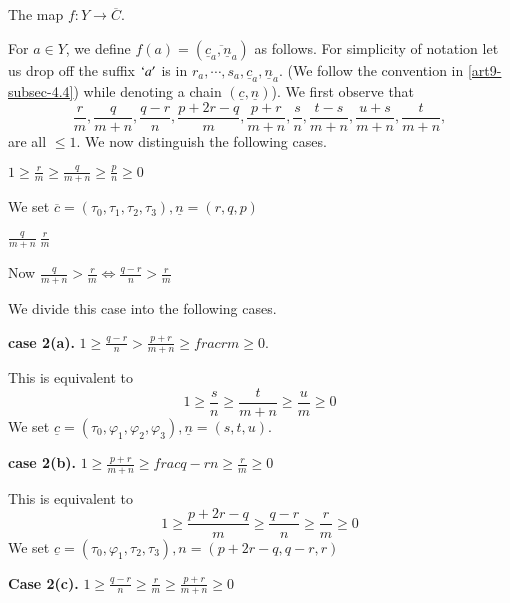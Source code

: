 \subsection{}\label{art9-subsec-8.3}

The map $f : Y \rightarrow \overline{C}$.

For $a \in Y$, we define $f(a)= (\overline{\underline{c}_{a}, \underline{n}_{a}})$ as follows. For simplicity of notation let us drop off the suffix $`a'$ is in $r_{a}, \cdots , s_{a}, \underline{c}_{a}, \underline{n}_{a}$. (We follow the
convention in \ref{art9-subsec-4.4}) while denoting a chain $(\underline{c}, \underline{n})$). We first observe that
$$
\frac{r}{m}, \frac{q}{m+n}, \frac{q-r}{n}, \frac{p+2r-q}{m}, \frac{p+r}{m+n}, \frac{s}{n}, \frac{t-s}{m+n}, \frac{u+s}{m+n}, \frac{t}{m+n},
$$ 
are all $\leq 1$. We now distinguish the following cases.

\setcounter{case}{0}
\begin{case}\label{art9-subsec8.3-case-1}
$1 \geq \frac{r}{m} \geq\frac{q}{m+n} \geq \frac{p}{n} \geq 0$

We set $\overline{c}= (\tau_{0}, \tau_{1}, \tau_{2}, \tau_{3}),\underline{n} = (r,q,p)$
\end{case}

\begin{case}\label{art9-subsec8.3-case-2}
$\frac{q}{m+n} \> \frac{r}{m}$

Now $\frac{q}{m+n} > \frac{r}{m} \Longleftrightarrow \frac{q-r}{n} > \frac{r}{m}$

We divide this case into the following cases.
\end{case}

\noindent
{\bf case 2(a).}\label{art9-subsec8.3-case-2(a)}
$ 1 \geq \frac{q-r}{n} > \frac{p+r}{m+n} \geq frac{r}{m} \geq 0$.

This is equivalent to
$$
1 \geq \frac{s}{n} \geq \frac{t}{m+n} \geq \frac{u}{m} \geq 0
$$
We set $\underline{c}= (\tau_{0},\varphi_{1}, \varphi_{2}, \varphi_{3}), \underline{n} = (s,t,u)$.

\medskip
\noindent
{\bf case 2(b).} $ 1 \geq \frac{p+r}{m+n} \geq frac{q-r}{n} \geq \frac{r}{m} \geq 0$

This is equivalent to
$$
1 \geq \frac{p + 2r-q}{m} \geq \frac{q-r}{n} \geq \frac{r}{m} \geq 0
$$
We set $\underline{c} = (\tau_{0}, \varphi_{1}, \tau_{2}, \tau_{3}), n= (p+2r-q, q-r,r)$

\medskip
\noindent
{\bf  Case 2(c).} $1 \geq \frac{q-r}{n} \geq \frac{r}{m} \geq \frac{p+r}{m+n} \geq 0$

